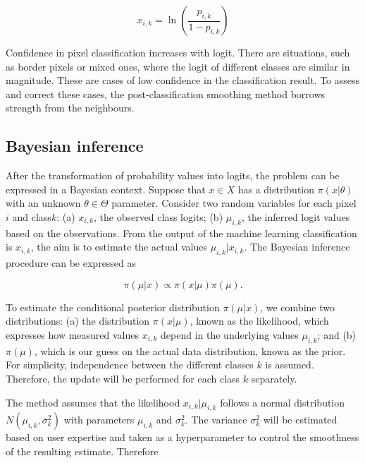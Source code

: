 \documentclass[
  shortnames]{jss}
\begin{document}
\begin{equation}
x_{i,k} = \ln \left(\frac{p_{i,k}}{1 - p_{i,k}}\right)
\end{equation}

Confidence in pixel classification increases with logit. There are situations, such as
border pixels or mixed ones, where the logit of different classes are similar in magnitude.
These are cases of low confidence in the classification result. To assess and correct these
cases, the post-classification smoothing method borrows strength from the neighbours.

\hypertarget{bayesian-inference}{%
\subsection{Bayesian inference}\label{bayesian-inference}}

After the transformation of probability values into logits, the problem can be expressed
in a Bayesian context. Suppose that \(x\in{}X\) has a distribution
\(\pi(x|\theta)\) with an unknown \(\theta{}\in{}\Theta{}\) parameter. Consider two random
variables for each pixel \(i\) and class\(k\): (a) \(x_{i,k}\), the observed class logits;
(b) \(\mu_{i,k}\), the inferred logit values based on the observations. From the output of
the machine learning classification is \(x_{i,k}\), the aim is to estimate the actual
values \(\mu_{i,k} | x_{i,k}\). The Bayesian inference procedure can be expressed as

\begin{equation}
\pi(\mu|x) \propto{} \pi(x|\mu)\pi(\mu).
\end{equation}

To estimate the conditional posterior distribution \(\pi(\mu|x)\), we combine two
distributions: (a) the distribution \(\pi(x|\mu)\), known as the likelihood,
which expresses how measured values \(x_{i,k}\) depend in the underlying values \(\mu_{i,k}\);
and (b) \(\pi(\mu)\), which is our guess on the actual data distribution, known as the prior.
For simplicity, independence between the different classes \(k\) is assumed. Therefore, the
update will be performed for each class \(k\) separately.

The method assumes that the likelihood \(x_{i,k} | \mu_{i,k}\) follows a normal
distribution \(N(\mu_{i,k}, \sigma^2_{k})\) with parameters \(\mu_{i,k}\) and \(\sigma^2_{k}\).
The variance \(\sigma^2_{k}\) will be estimated based on user expertise and taken as
a hyperparameter to control the smoothness of the resulting estimate. Therefore
\end{document}
